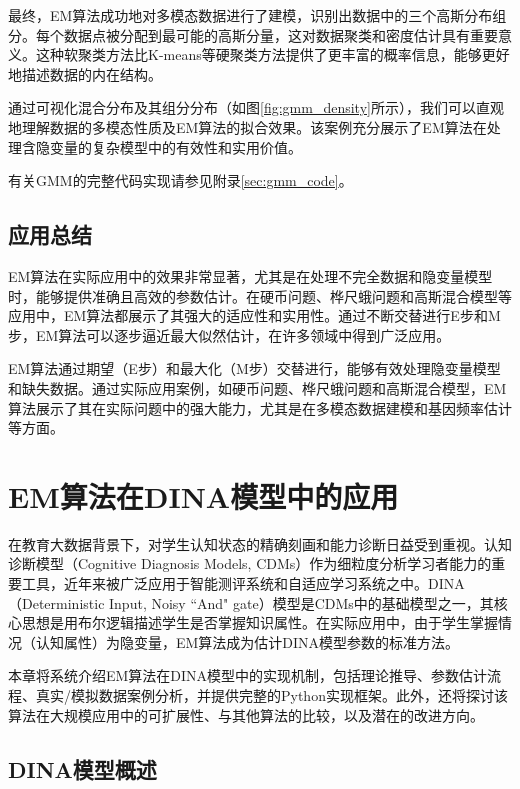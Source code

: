 \documentclass[a4paper,12pt]{ctexart} %
\begin{document}
最终，EM算法成功地对多模态数据进行了建模，识别出数据中的三个高斯分布组分。每个数据点被分配到最可能的高斯分量，这对数据聚类和密度估计具有重要意义。这种软聚类方法比K-means等硬聚类方法提供了更丰富的概率信息，能够更好地描述数据的内在结构。

通过可视化混合分布及其组分分布（如图\ref{fig:gmm_density}所示），我们可以直观地理解数据的多模态性质及EM算法的拟合效果。该案例充分展示了EM算法在处理含隐变量的复杂模型中的有效性和实用价值。

有关GMM的完整代码实现请参见附录\ref{sec:gmm_code}。

\subsection{应用总结}

EM算法在实际应用中的效果非常显著，尤其是在处理不完全数据和隐变量模型时，能够提供准确且高效的参数估计。在硬币问题、桦尺蛾问题和高斯混合模型等应用中，EM算法都展示了其强大的适应性和实用性。通过不断交替进行E步和M步，EM算法可以逐步逼近最大似然估计，在许多领域中得到广泛应用。

\begin{learnbox}{\kaishu
EM算法通过期望（E步）和最大化（M步）交替进行，能够有效处理隐变量模型和缺失数据。通过实际应用案例，如硬币问题、桦尺蛾问题和高斯混合模型，EM算法展示了其在实际问题中的强大能力，尤其是在多模态数据建模和基因频率估计等方面。}
\end{learnbox}

\section{EM算法在DINA模型中的应用}

在教育大数据背景下，对学生认知状态的精确刻画和能力诊断日益受到重视。认知诊断模型（Cognitive Diagnosis Models, CDMs）作为细粒度分析学习者能力的重要工具，近年来被广泛应用于智能测评系统和自适应学习系统之中。DINA（Deterministic Input, Noisy ``And" gate）模型是CDMs中的基础模型之一，其核心思想是用布尔逻辑描述学生是否掌握知识属性。在实际应用中，由于学生掌握情况（认知属性）为隐变量，EM算法成为估计DINA模型参数的标准方法。

本章将系统介绍EM算法在DINA模型中的实现机制，包括理论推导、参数估计流程、真实/模拟数据案例分析，并提供完整的Python实现框架。此外，还将探讨该算法在大规模应用中的可扩展性、与其他算法的比较，以及潜在的改进方向。

\subsection{DINA模型概述}
\end{document}
